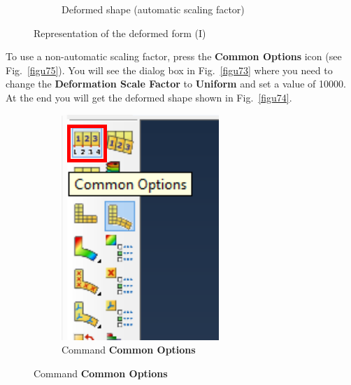 \begin{enumerate}
\begin{figure}[H]
\begin{subfigure}{0.59\textwidth}
      \caption{Deformed shape (automatic scaling factor)}
      \label{figu72}
    \end{subfigure}%
    \caption{Representation of the deformed form (I)}
  \end{figure}

  To use a non-automatic scaling factor, press the \textbf{Common
    Options} icon (see Fig.~\ref{figu75}). You will see the dialog box
  in Fig.~\ref{figu73} where you need to change the
  \textbf{Deformation Scale Factor} to \textbf{Uniform} and set a
  value of 10000. At the end you will get the deformed shape shown in
  Fig.~\ref{figu74}.
  \begin{figure}[H]
    \centering
    \begin{subfigure}{0.19\textwidth}
      \includegraphics[width=\textwidth]{./body/images/imagen75.pdf}
      \caption{Command \textbf{Common Options}}

\end{subfigure}
\end{figure}
\end{enumerate}
